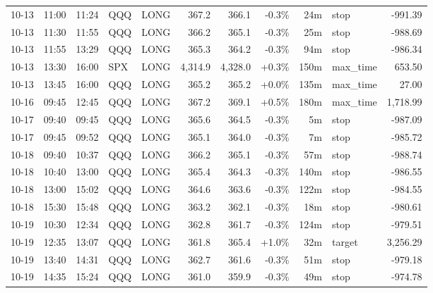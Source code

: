 \documentclass[11pt,a4paper,twoside]{article}
\begin{document}
\begin{center}
\begin{longtable}{>{\color{txtmain}}l l l l l r r r r >{\color{txtmain}}l r}
10-13 & 11:00 & 11:24 & QQQ & LONG & 367.2 & 366.1 & \textcolor{lossred}{-0.3\%} & 24m & stop & \textcolor{lossred}{-991.39} \\
10-13 & 11:30 & 11:55 & QQQ & LONG & 366.2 & 365.1 & \textcolor{lossred}{-0.3\%} & 25m & stop & \textcolor{lossred}{-988.69} \\
10-13 & 11:55 & 13:29 & QQQ & LONG & 365.3 & 364.2 & \textcolor{lossred}{-0.3\%} & 94m & stop & \textcolor{lossred}{-986.34} \\
10-13 & 13:30 & 16:00 & SPX & LONG & 4,314.9 & 4,328.0 & \textcolor{wingreen}{+0.3\%} & 150m & max\_time & \textcolor{wingreen}{653.50} \\
10-13 & 13:45 & 16:00 & QQQ & LONG & 365.2 & 365.2 & \textcolor{wingreen}{+0.0\%} & 135m & max\_time & \textcolor{wingreen}{27.00} \\
10-16 & 09:45 & 12:45 & QQQ & LONG & 367.2 & 369.1 & \textcolor{wingreen}{+0.5\%} & 180m & max\_time & \textcolor{wingreen}{1,718.99} \\
10-17 & 09:40 & 09:45 & QQQ & LONG & 365.6 & 364.5 & \textcolor{lossred}{-0.3\%} & 5m & stop & \textcolor{lossred}{-987.09} \\
10-17 & 09:45 & 09:52 & QQQ & LONG & 365.1 & 364.0 & \textcolor{lossred}{-0.3\%} & 7m & stop & \textcolor{lossred}{-985.72} \\
10-18 & 09:40 & 10:37 & QQQ & LONG & 366.2 & 365.1 & \textcolor{lossred}{-0.3\%} & 57m & stop & \textcolor{lossred}{-988.74} \\
10-18 & 10:40 & 13:00 & QQQ & LONG & 365.4 & 364.3 & \textcolor{lossred}{-0.3\%} & 140m & stop & \textcolor{lossred}{-986.55} \\
10-18 & 13:00 & 15:02 & QQQ & LONG & 364.6 & 363.6 & \textcolor{lossred}{-0.3\%} & 122m & stop & \textcolor{lossred}{-984.55} \\
10-18 & 15:30 & 15:48 & QQQ & LONG & 363.2 & 362.1 & \textcolor{lossred}{-0.3\%} & 18m & stop & \textcolor{lossred}{-980.61} \\
10-19 & 10:30 & 12:34 & QQQ & LONG & 362.8 & 361.7 & \textcolor{lossred}{-0.3\%} & 124m & stop & \textcolor{lossred}{-979.51} \\
10-19 & 12:35 & 13:07 & QQQ & LONG & 361.8 & 365.4 & \textcolor{wingreen}{+1.0\%} & 32m & target & \textcolor{wingreen}{3,256.29} \\
10-19 & 13:40 & 14:31 & QQQ & LONG & 362.7 & 361.6 & \textcolor{lossred}{-0.3\%} & 51m & stop & \textcolor{lossred}{-979.18} \\
10-19 & 14:35 & 15:24 & QQQ & LONG & 361.0 & 359.9 & \textcolor{lossred}{-0.3\%} & 49m & stop & \textcolor{lossred}{-974.78} \\

\end{longtable}
\end{center}
\end{document}

